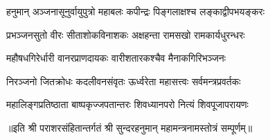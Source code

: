 

\twolineshloka
{हनुमान् अञ्जनासूनुर्वायुपुत्रो महाबलः}
{कपीन्द्रः पिङ्गलाक्षश्च लङ्काद्वीपभयङ्करः}

\twolineshloka
{प्रभञ्जनसुतो वीरः सीताशोकविनाशकः}
{अक्षहन्ता रामसखो रामकार्यधुरन्धरः}

\twolineshloka
{महौषधगिरेर्धारी वानरप्राणदायकः}
{वारीशतारकश्चैव मैनाकगिरिभञ्जनः}

\twolineshloka
{निरञ्जनो जितक्रोधः कदलीवनसंवृतः}
{ऊर्ध्वरेता महासत्त्वः सर्वमन्त्रप्रवर्तकः}

\twolineshloka
{महालिङ्गप्रतिष्ठाता बाष्पकृज्जपतान्तरः}
{शिवध्यानपरो नित्यं शिवपूजापरायणः}


॥इति श्री पराशरसंहितान्तर्गतं श्री सुन्दरहनुमान् महामन्त्रनामस्तोत्रं सम्पूर्णम्॥